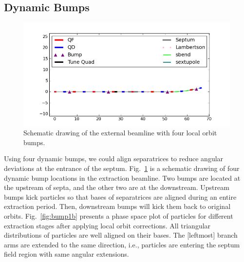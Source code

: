 \documentclass[aps,prstab,onecolumn,preprint]{revtex4-1}
\begin{document}
\subsection{\label{sec:bump1}Dynamic Bumps}

\begin{figure}[!tbp]
  \includegraphics[width=.45\textwidth]{img/fig_bump2}
  \caption{\label{fig:bump2}Schematic drawing of the external beamline with four local orbit bumps.}
\end{figure}

Using four dynamic bumps, we could align separatrices to reduce angular deviations at the entrance of the septum. Fig.~\ref{fig:bump2} is a schematic drawing of four dynamic bump locations in the extraction beamline. Two bumps are located at the upstream of septa, and the other two are at the downstream. Upstream bumps kick particles so that bases of separatrices are aligned during an entire extraction period. Then, downstream bumps will kick them back to original orbits. Fig.~\ref{fig:bump1b} presents a phase space plot of particles for different extraction stages after applying local orbit corrections. All triangular distributions of particles are well aligned on their bases.
The [leftmost] branch arms are extended to the same direction, i.e., particles are entering the septum field region with same angular extensions.
\end{document}
